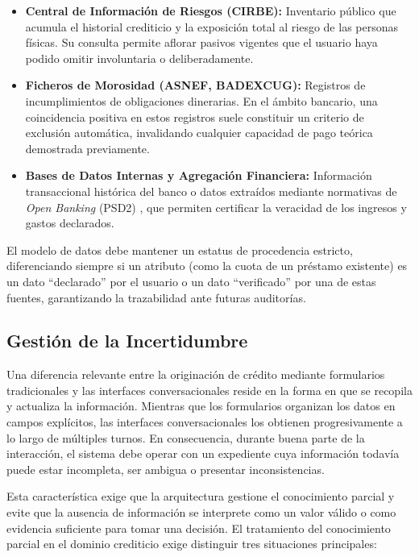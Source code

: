 \documentclass[12pt,a4paper]{report}
\begin{document}
\begin{itemize}
    \item \textbf{Central de Información de Riesgos (CIRBE):} Inventario público que acumula el historial crediticio y la exposición total al riesgo de las personas físicas. Su consulta permite aflorar pasivos vigentes que el usuario haya podido omitir involuntaria o deliberadamente.
    \item \textbf{Ficheros de Morosidad (ASNEF, BADEXCUG):} Registros de incumplimientos de obligaciones dinerarias. En el ámbito bancario, una coincidencia positiva en estos registros suele constituir un criterio de exclusión automática, invalidando cualquier capacidad de pago teórica demostrada previamente.
    \item \textbf{Bases de Datos Internas y Agregación Financiera:} Información transaccional histórica del banco o datos extraídos mediante normativas de \textit{Open Banking} (PSD2) \cite{psd2_2015}, que permiten certificar la veracidad de los ingresos y gastos declarados.
\end{itemize}

El modelo de datos debe mantener un estatus de procedencia estricto, diferenciando siempre si un atributo (como la cuota de un préstamo existente) es un dato ``declarado'' por el usuario o un dato ``verificado'' por una de estas fuentes, garantizando la trazabilidad ante futuras auditorías.

\subsection{Gestión de la Incertidumbre}

Una diferencia relevante entre la originación de crédito mediante formularios tradicionales y las interfaces conversacionales reside en la forma en que se recopila y actualiza la información. Mientras que los formularios organizan los datos en campos explícitos, las interfaces conversacionales los obtienen progresivamente a lo largo de múltiples turnos. En consecuencia, durante buena parte de la interacción, el sistema debe operar con un expediente cuya información todavía puede estar incompleta, ser ambigua o presentar inconsistencias.

Esta característica exige que la arquitectura gestione el conocimiento parcial y evite que la ausencia de información se interprete como un valor válido o como evidencia suficiente para tomar una decisión. El tratamiento del conocimiento parcial en el dominio crediticio exige distinguir tres situaciones principales:
\end{document}

